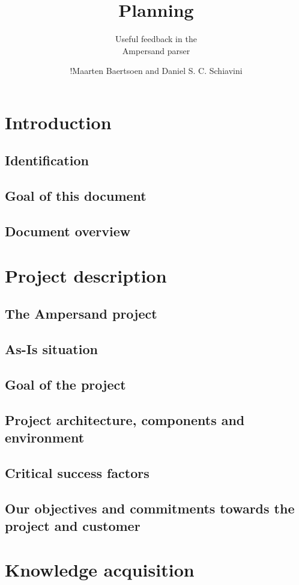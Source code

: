 \documentclass[a4paper,12pt,abstracton,titlepage]{scrartcl}
\author{!Maarten Baertsoen and Daniel S. C. Schiavini}
\affil{Open Universiteit Nederland, faculteit Informatica \\
	T61327 - Afstudeerproject bachelor informatica}
\title{Planning}
\subtitle{Useful feedback in the\\ Ampersand parser}
\begin{document}
\maketitle
\newpage

\tableofcontents
\clearpage

\section{Introduction}
\subsection{Identification}
\subsection{Goal of this document}
\subsection{Document overview}

\section{Project description}
\subsection{The Ampersand project}
\subsection{As-Is situation}
\subsection{Goal of the project}
\subsection{Project architecture, components and environment}
\subsection{Critical success factors}
\subsection{Our objectives and commitments towards the project and customer}

\section{Knowledge acquisition}
\end{document}

